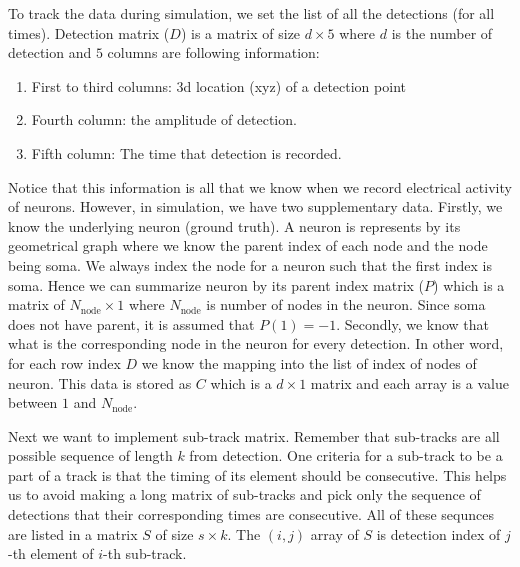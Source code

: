 \documentclass{article}
\begin{document}
To track the data during simulation, we set the list of all the detections (for all times). Detection matrix ($D$) is a matrix of size $d \times 5$ where $d$ is the number of detection and $5$ columns are following information:
\begin{enumerate}
\item First to third columns: 3d location (xyz) of a detection point
\item Fourth column: the amplitude of detection.
\item Fifth column: The time that detection is recorded.
\end{enumerate}
Notice that this information is all that we know when we record electrical activity of neurons. However, in simulation, we have two supplementary data. Firstly, we know the underlying neuron (ground truth). A neuron is represents by its geometrical graph where we know the parent index of each node and the node being soma. We always index the node for a neuron such that the first index is soma. Hence we can summarize neuron by its parent index matrix ($P$) which is a matrix of $N_\text{node}\times 1$ where $N_\text{node}$ is number of nodes in the neuron. Since soma does not have parent, it is assumed that $P(1) = -1$. Secondly, we know that what is the corresponding node in the neuron for every detection. In other word, for each row index $D$ we know the mapping into the list of index of nodes of neuron. This data is stored as $C$ which is a $d \times 1$ matrix and each array is a value between $1$ and $N_\text{node}$.

Next we want to implement sub-track matrix. Remember that sub-tracks are all possible sequence of length $k$ from detection. One criteria for a sub-track to be a part of a track is that the timing of its element should be consecutive. This helps us to avoid making a long matrix of sub-tracks and pick only the sequence of detections that their corresponding times are consecutive. All of these sequnces are listed in a matrix $S$ of size $s \times k$. The $(i, j)$ array of $S$ is detection index of  $j$-th element of $i$-th sub-track. 




\end{document}

